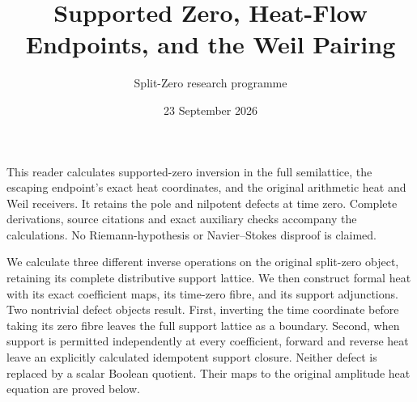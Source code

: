 \documentclass[11pt,a4paper]{article}
\title{Supported Zero, Heat-Flow Endpoints, and the Weil Pairing}
\author{Split-Zero research programme}
\date{23 September 2026}
\theoremstyle{definition}\newtheorem{definition}[theorem]{Definition}
\newcommand{\B}{\mathbb B}\newcommand{\N}{\mathbb N}
\begin{document}
\maketitle
This reader calculates supported-zero inversion in the full semilattice,
the escaping endpoint's exact heat coordinates, and the original arithmetic
heat and Weil receivers. It retains the pole and nilpotent defects at time
zero. Complete derivations, source citations and exact auxiliary checks
accompany the calculations. No Riemann-hypothesis or Navier--Stokes
disproof is claimed.
\tableofcontents

\begingroup
\renewcommand{\B}{\mathbf B}



We calculate three different inverse operations on the original
split-zero object, retaining its complete distributive support lattice.
We then construct formal heat with its exact coefficient maps, its
time-zero fibre, and its support adjunctions.  Two nontrivial defect
objects result.  First, inverting the time coordinate before taking
its zero fibre leaves the full support lattice as a boundary.
Second, when support is permitted independently at every coefficient,
forward and reverse heat leave an explicitly calculated idempotent
support closure.  Neither defect is replaced by a scalar Boolean
quotient.  Their maps to the original amplitude heat equation are
proved below.
\end{document}
